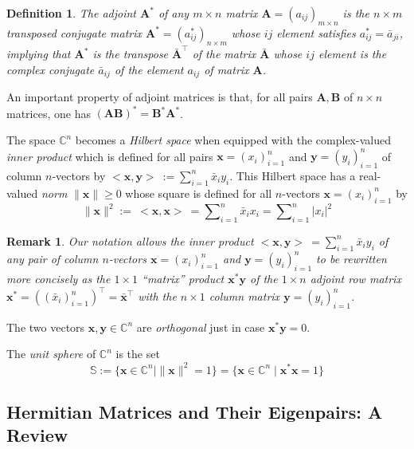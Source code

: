 \documentclass[11pt]{article}
\newcommand \C { \mathbb{C} }
\newcommand \Sph { \mathbb{S} }
\newtheorem{definition}[theorem]{Definition}
\newtheorem{remark}[theorem]{Remark}
\begin{document}
\begin{definition}
	The \emph{adjoint} $ \mathbf A^* $ 
	of any $m \times n$ matrix $ \mathbf A = ( a_{ij} )_{m \times n} $ is the $n \times m$ 
	transposed conjugate matrix $ \mathbf A^* = ( a^*_{ij} )_{n \times m} $
	whose $ij$ element satisfies $ a^*_{ij} = \bar a_{ji} $, 
	implying that $ \mathbf A^* $ is the transpose $ \bar { \mathbf A}^\top $
	of the matrix $ \bar { \mathbf A}$ whose $ij$ element 
	is the complex conjugate $ \bar a_{ij} $ of the element $ a_{ij} $ of matrix $ \mathbf A$.
\end{definition} 

An important property of adjoint matrices is that, 
for all pairs $ \mathbf A, \mathbf B$ of $n \times n$ matrices,
one has $( \mathbf A \mathbf B)^* = \mathbf B^* \mathbf A^* $.

\smallskip
The space $ \C^n $ becomes a \emph{Hilbert space} when equipped
with the complex-valued \emph{inner product} which is defined
for all pairs $ \mathbf x = ( x_i )_{i = 1}^n $
and $ \mathbf y = ( y_i )_{i = 1}^n $ of column $n$-vectors
by $< \mathbf x, \mathbf y > \ := \sum_{i = 1}^n \bar x_i y_i $. 
This Hilbert space has a real-valued \emph{norm} $ \| \mathbf x \| \ge 0$
whose square is defined for all $n$-vectors $ \mathbf x = ( x_i )_{i = 1}^n $ by
\[ \| \mathbf x \|^2 := \ < \mathbf x, \mathbf x > \ = \sum\nolimits _{i = 1}^n \bar x_i x_i 
	= \sum\nolimits _{i = 1}^n | x_i |^2 \]
\begin{remark}
	Our notation allows 
	the inner product $< \mathbf x, \mathbf y > \ = \sum_{i = 1}^n \bar x_i y_i $
	of any pair of column $n$-vectors $ \mathbf x = ( x_i )_{i = 1}^n $ 
	and $ \mathbf y = ( y_i )_{i = 1}^n $ to be rewritten more concisely
	as the $1 \times 1$ ``matrix'' product $ \mathbf x^* \mathbf y$
	of the $1 \times n$ adjoint row matrix 
	\( \mathbf x^* = \left( ( \bar x_i )_{i = 1}^n \right)^\top = \mathbf { \bar x}^\top \)
	with the $n \times 1$ column matrix $ \mathbf y = ( y_i )_{i = 1}^n $.
\end{remark}

The two vectors $ \mathbf x, \mathbf y \in \C^n $ are \emph{orthogonal} 
just in case $ \mathbf x^* \mathbf y = 0$.

The \emph{unit sphere} of $ \C^n $ is the set
\[ \Sph := \{ \mathbf x \in \C^n \mid \| \mathbf x \|^2 = 1 \} 
		  = \{ \mathbf x \in \C^n \mid \mathbf x^* \mathbf x = 1 \} \]
 
\subsection{Hermitian Matrices and Their Eigenpairs: A Review}
\end{document}
